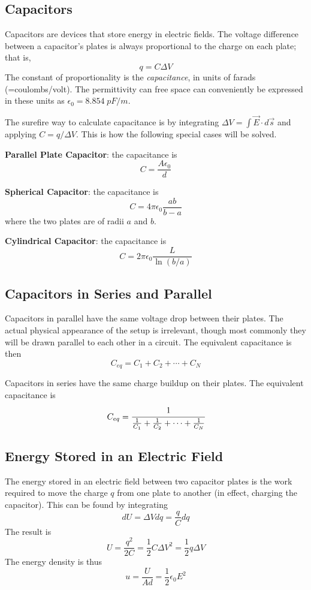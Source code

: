\documentclass[../PhysicsFormulae]{subfiles}
\begin{document}
\subsection{Capacitors}
Capacitors are devices that store energy in electric fields. The voltage difference between a capacitor's plates is always proportional to the charge on each plate; that is, 
\[ q = C \Delta V \]
The constant of proportionality is the \textit{capacitance}, in units of farads (=coulombs/volt). The permittivity can free space can conveniently be expressed in these units as $\epsilon_0 = 8.854 \; pF/m$.  \bigskip

The surefire way to calculate capacitance is by integrating $\Delta V = \int \vec{E} \cdot d\vec{s}$ and applying $C=q/\Delta V$. This is how the following special cases will be solved. 

\textbf{Parallel Plate Capacitor}: the capacitance is 
\[ C = \frac{A\epsilon_0}{d} \]

\textbf{Spherical Capacitor}: the capacitance is 
\[ C = 4\pi \epsilon_0 \frac{ab}{b-a} \]
where the two plates are of radii $a$ and $b$. \bigskip

\textbf{Cylindrical Capacitor}: the capacitance is 
\[ C = 2\pi \epsilon_0 \frac{L}{\ln(b/a)} \]

\subsection{Capacitors in Series and Parallel}
Capacitors in parallel have the same voltage drop between their plates. The actual physical appearance of the setup is irrelevant, though most commonly they will be drawn parallel to each other in a circuit. The equivalent capacitance is then
\[ C_{eq} = C_1 + C_2 + \cdots + C_N \]

Capacitors in series have the same charge buildup on their plates. The equivalent capacitance is
\[ C_{eq} = \cfrac{1}{\frac{1}{C_1} + \frac{1}{C_2} + \cdots + \frac{1}{C_N}} \]

\subsection{Energy Stored in an Electric Field}
The energy stored in an electric field between two capacitor plates is the work required to move the charge $q$ from one plate to another (in effect, charging the capacitor). This can be found by integrating
\[ dU = \Delta V dq = \frac{q}{C}dq \]
The result is 
\[ U = \frac{q^2}{2C} = \frac{1}{2}C \Delta V^2 = \frac{1}{2}q\Delta V \]
The energy density is thus
\[ u = \frac{U}{Ad} = \frac{1}{2} \epsilon_0 E^2 \]
\end{document}
